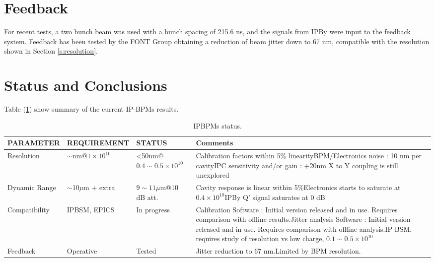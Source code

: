 \section{Feedback}
For recent tests, a two bunch beam was used with a bunch spacing of 215.6 ns, and the signals from IPBy were input to the feedback system. Feedback has been tested by the FONT Group \cite{FONTfb:2015} obtaining a reduction of beam jitter down to 67 nm, compatible with the resolution shown in Section \ref{s:resolution}.
\section{Status and Conclusions}
Table (\ref{t:IPBPMsStatus}) show summary of the current IP-BPMs results.\par
\begin{table}[hbt]
\centering
\scriptsize
\begin{tabular}{l|l|l|p{6cm}}\hline
PARAMETER & REQUIREMENT & STATUS & Comments\\\hline\hline
Resolution & $\sim$nm@$1\times10^{10}$ & <50nm@$0.4\sim0.5\times10^{10}$ & Calibration factors within 5\% linearity\newline BPM/Electronics noise : 10 nm per cavity\newline IPC sensitivity and/or gain : +20nm \newline X to Y coupling is still unexplored\\\hline
Dynamic Range & $\sim$10$\mu$m + extra & $9\sim11\mu$m@10 dB att. & Cavity response is linear within 5\%\newline Electronics starts to saturate at $0.4\times10^{10}$\newline IPBy Q' signal saturates at 0 dB\\\hline
Compatibility & IPBSM, EPICS & In progress &Calibration Software : Initial version released and in use. Requires comparison with offline results.\newline Jitter analysis Software : Initial version released and in use. Requires comparison with offline analysis.\newline IP-BSM, requires study of resolution vs low charge, $0.1\sim0.5\times10^{10}$ \\\hline
Feedback & Operative & Tested	& Jitter reduction to 67 nm.\newline Limited by BPM resolution.\\\hline
\end{tabular}\caption{IPBPMs status.}\label{t:IPBPMsStatus}
\end{table}
